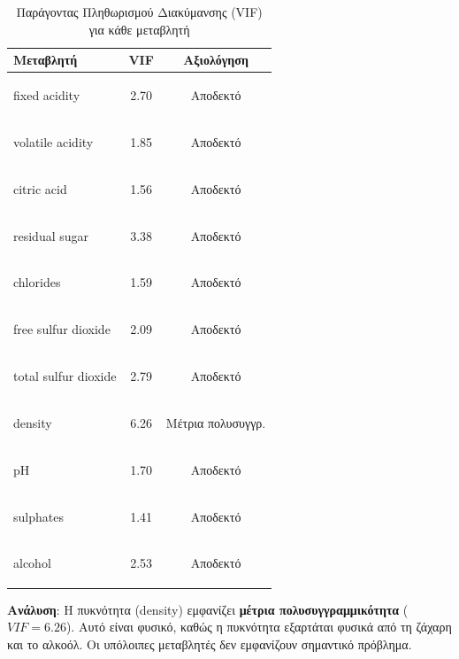 \documentclass[12pt,a4paper]{article}
\begin{document}
\begin{table}[H]
\centering
\caption{Παράγοντας Πληθωρισμού Διακύμανσης (VIF) για κάθε μεταβλητή}
\label{tab:vif}
\begin{tabular}{lcc}
\toprule
\textbf{Μεταβλητή} & \textbf{VIF} & \textbf{Αξιολόγηση} \\
\midrule
\begin{english}fixed acidity\end{english} & 2.70 & Αποδεκτό \\
\begin{english}volatile acidity\end{english} & 1.85 & Αποδεκτό \\
\begin{english}citric acid\end{english} & 1.56 & Αποδεκτό \\
\begin{english}residual sugar\end{english} & 3.38 & Αποδεκτό \\
\begin{english}chlorides\end{english} & 1.59 & Αποδεκτό \\
\begin{english}free sulfur dioxide\end{english} & 2.09 & Αποδεκτό \\
\begin{english}total sulfur dioxide\end{english} & 2.79 & Αποδεκτό \\
\begin{english}density\end{english} & 6.26 & Μέτρια πολυσυγγρ. \\
\begin{english}pH\end{english} & 1.70 & Αποδεκτό \\
\begin{english}sulphates\end{english} & 1.41 & Αποδεκτό \\
\begin{english}alcohol\end{english} & 2.53 & Αποδεκτό \\
\bottomrule
\end{tabular}
\end{table}

\textbf{Ανάλυση}: Η πυκνότητα (density) εμφανίζει \textbf{μέτρια πολυσυγγραμμικότητα} ($VIF = 6.26$). Αυτό είναι φυσικό, καθώς η πυκνότητα εξαρτάται φυσικά από τη ζάχαρη και το αλκοόλ. Οι υπόλοιπες μεταβλητές δεν εμφανίζουν σημαντικό πρόβλημα.
\end{document}
